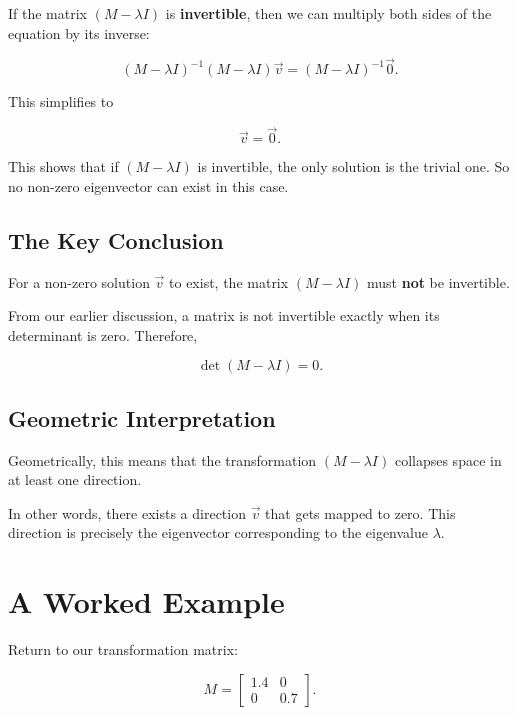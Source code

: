 \documentclass[11pt,openany]{book}
\theoremstyle{definition}
\begin{document}
If the matrix $(M - \lambda I)$ is \textbf{invertible}, then we can multiply both sides of the equation by its inverse:

\[
(M - \lambda I)^{-1}(M - \lambda I)\vec{v} = (M - \lambda I)^{-1}\vec{0}.
\]

This simplifies to

\[
\vec{v} = \vec{0}.
\]

\medskip

This shows that if $(M - \lambda I)$ is invertible, the only solution is the trivial one.
So no non-zero eigenvector can exist in this case.

\medskip

\subsection{The Key Conclusion}

For a non-zero solution $\vec{v}$ to exist, the matrix $(M - \lambda I)$ must \textbf{not} be invertible.

\medskip

From our earlier discussion, a matrix is not invertible exactly when its determinant is zero. Therefore,

\[
\det(M - \lambda I) = 0.
\]

\medskip

\subsection{Geometric Interpretation}

Geometrically, this means that the transformation $(M - \lambda I)$ collapses space in at least one direction.

\medskip

In other words, there exists a direction $\vec{v}$ that gets mapped to zero.
This direction is precisely the eigenvector corresponding to the eigenvalue $\lambda$.

\section{A Worked Example}

Return to our transformation matrix:

\[
M = \begin{bmatrix} 1.4 & 0 \\ 0 & 0.7 \end{bmatrix}.
\]
\end{document}
